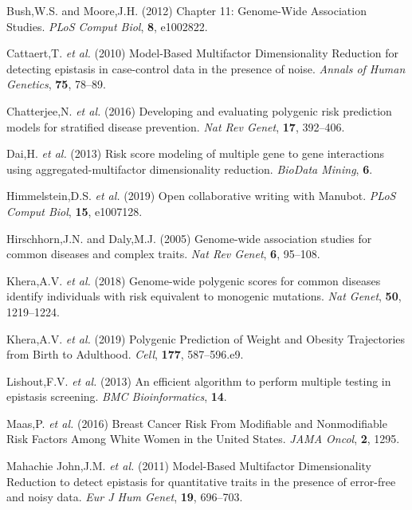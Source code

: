 \documentclass[a4paper,twoside, 9pt]{article}
\begin{document}
\hypertarget{refs}{}
\leavevmode\hypertarget{ref-iFUfVw9V}{}%
Bush,W.S. and Moore,J.H. (2012) Chapter 11: Genome-Wide Association
Studies. \emph{PLoS Comput Biol}, \textbf{8}, e1002822.

\leavevmode\hypertarget{ref-16AnEAMje}{}%
Cattaert,T. \emph{et al.} (2010) Model-Based Multifactor Dimensionality
Reduction for detecting epistasis in case-control data in the presence
of noise. \emph{Annals of Human Genetics}, \textbf{75}, 78--89.

\leavevmode\hypertarget{ref-auyRflEe}{}%
Chatterjee,N. \emph{et al.} (2016) Developing and evaluating polygenic
risk prediction models for stratified disease prevention. \emph{Nat Rev
Genet}, \textbf{17}, 392--406.

\leavevmode\hypertarget{ref-93PfLXPZ}{}%
Dai,H. \emph{et al.} (2013) Risk score modeling of multiple gene to gene
interactions using aggregated-multifactor dimensionality reduction.
\emph{BioData Mining}, \textbf{6}.

\leavevmode\hypertarget{ref-YuJbg3zO}{}%
Himmelstein,D.S. \emph{et al.} (2019) Open collaborative writing with
Manubot. \emph{PLoS Comput Biol}, \textbf{15}, e1007128.

\leavevmode\hypertarget{ref-5cdeEdUS}{}%
Hirschhorn,J.N. and Daly,M.J. (2005) Genome-wide association studies for
common diseases and complex traits. \emph{Nat Rev Genet}, \textbf{6},
95--108.

\leavevmode\hypertarget{ref-Gh0gKn77}{}%
Khera,A.V. \emph{et al.} (2018) Genome-wide polygenic scores for common
diseases identify individuals with risk equivalent to monogenic
mutations. \emph{Nat Genet}, \textbf{50}, 1219--1224.

\leavevmode\hypertarget{ref-oBD9eYkN}{}%
Khera,A.V. \emph{et al.} (2019) Polygenic Prediction of Weight and
Obesity Trajectories from Birth to Adulthood. \emph{Cell}, \textbf{177},
587--596.e9.

\leavevmode\hypertarget{ref-S6nj6BFK}{}%
Lishout,F.V. \emph{et al.} (2013) An efficient algorithm to perform
multiple testing in epistasis screening. \emph{BMC Bioinformatics},
\textbf{14}.

\leavevmode\hypertarget{ref-Z12fynub}{}%
Maas,P. \emph{et al.} (2016) Breast Cancer Risk From Modifiable and
Nonmodifiable Risk Factors Among White Women in the United States.
\emph{JAMA Oncol}, \textbf{2}, 1295.

\leavevmode\hypertarget{ref-kN4MaLuT}{}%
Mahachie John,J.M. \emph{et al.} (2011) Model-Based Multifactor
Dimensionality Reduction to detect epistasis for quantitative traits in
the presence of error-free and noisy data. \emph{Eur J Hum Genet},
\textbf{19}, 696--703.
\end{document}

